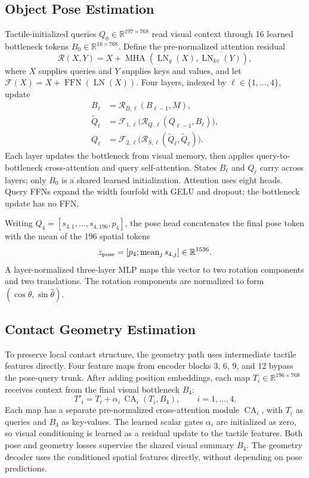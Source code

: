 \documentclass[letterpaper,10pt,conference]{ieeeconf}
\begin{document}
\subsection{Object Pose Estimation}
\label{sec:trunk}
Tactile-initialized queries $Q_0\in\mathbb R^{197\times768}$ read visual context through 16 learned bottleneck tokens $B_0\in\mathbb R^{16\times768}$. Define the pre-normalized attention residual
\begin{equation}
\mathcal R(X,Y)=X+\operatorname{MHA}(\operatorname{LN}_q(X),\operatorname{LN}_{kv}(Y)),
\end{equation}
where $X$ supplies queries and $Y$ supplies keys and values, and let $\mathcal F(X)=X+\operatorname{FFN}(\operatorname{LN}(X))$. Four layers, indexed by $\ell\in\{1,\ldots,4\}$, update
\begin{align}
B_\ell&=\mathcal R_{B,\ell}(B_{\ell-1},M),\\
\widetilde Q_\ell&=\mathcal F_{1,\ell}\bigl(\mathcal R_{Q,\ell}(Q_{\ell-1},B_\ell)\bigr),\\
Q_\ell&=\mathcal F_{2,\ell}\bigl(\mathcal R_{S,\ell}(\widetilde Q_\ell,\widetilde Q_\ell)\bigr).
\end{align}
Each layer updates the bottleneck from visual memory, then applies query-to-bottleneck cross-attention and query self-attention. States $B_\ell$ and $Q_\ell$ carry across layers; only $B_0$ is a shared learned initialization. Attention uses eight heads. Query FFNs expand the width fourfold with GELU and dropout; the bottleneck update has no FFN.

Writing $Q_4=[s_{4,1},\ldots,s_{4,196},p_4]$, the pose head concatenates the final pose token with the mean of the 196 spatial tokens
\begin{equation}
z_{\rm pose}=[p_4;\operatorname{mean}_{j}s_{4,j}]\in\mathbb R^{1536}.
\end{equation}
A layer-normalized three-layer MLP maps this vector to two rotation components and two translations. The rotation components are normalized to form $(\cos\hat\theta,\sin\hat\theta)$.

\subsection{Contact Geometry Estimation}
\label{sec:decoupled}
To preserve local contact structure, the geometry path uses intermediate tactile features directly. Four feature maps from encoder blocks 3, 6, 9, and 12 bypass the pose-query trunk. After adding position embeddings, each map $T_i\in\mathbb R^{196\times768}$ receives context from the final visual bottleneck $B_4$:
\begin{equation}
T'_i=T_i+\alpha_i\,\operatorname{CA}_i(T_i,B_4),\qquad i=1,\ldots,4.
\label{eq:tap_inject}
\end{equation}
Each map has a separate pre-normalized cross-attention module $\operatorname{CA}_i$, with $T_i$ as queries and $B_4$ as key-values. The learned scalar gates $\alpha_i$ are initialized as zero, so visual conditioning is learned as a residual update to the tactile features. Both pose and geometry losses supervise the shared visual summary $B_4$.
The geometry decoder uses the conditioned spatial features directly, without depending on pose predictions. 
\end{document}
